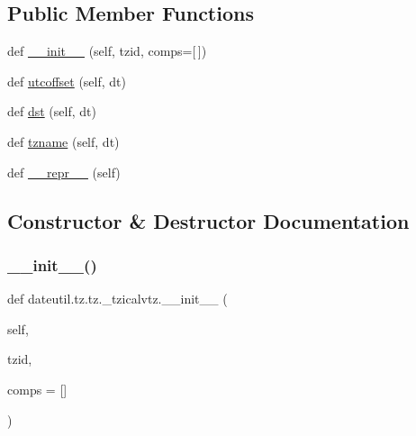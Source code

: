 \subsection*{Public Member Functions}
\begin{DoxyCompactItemize}
\item 
def \hyperlink{classdateutil_1_1tz_1_1tz_1_1__tzicalvtz_a0f03432d9e213d5a39396038c66f37a8}{\+\_\+\+\_\+init\+\_\+\+\_\+} (self, tzid, comps=\mbox{[}$\,$\mbox{]})
\item 
def \hyperlink{classdateutil_1_1tz_1_1tz_1_1__tzicalvtz_ac07c45cd35134945172c0653ce5948e8}{utcoffset} (self, dt)
\item 
def \hyperlink{classdateutil_1_1tz_1_1tz_1_1__tzicalvtz_a48b15f5030668979bcc95168a9f08cdc}{dst} (self, dt)
\item 
def \hyperlink{classdateutil_1_1tz_1_1tz_1_1__tzicalvtz_af7885f8ddd6a8fd6d1c48a292bc444bf}{tzname} (self, dt)
\item 
def \hyperlink{classdateutil_1_1tz_1_1tz_1_1__tzicalvtz_acc1bd5423fbe739a7c10c72ca3c953d4}{\+\_\+\+\_\+repr\+\_\+\+\_\+} (self)
\end{DoxyCompactItemize}


\subsection{Constructor \& Destructor Documentation}
\mbox{\label{classdateutil_1_1tz_1_1tz_1_1__tzicalvtz_a0f03432d9e213d5a39396038c66f37a8}} 
\subsubsection{\texorpdfstring{\+\_\+\+\_\+init\+\_\+\+\_\+()}{\_\_init\_\_()}}
{\footnotesize\ttfamily def dateutil.\+tz.\+tz.\+\_\+tzicalvtz.\+\_\+\+\_\+init\+\_\+\+\_\+ (\begin{DoxyParamCaption}\item[{}]{self,  }\item[{}]{tzid,  }\item[{}]{comps = {\ttfamily \mbox{[}\mbox{]}} }\end{DoxyParamCaption})}



